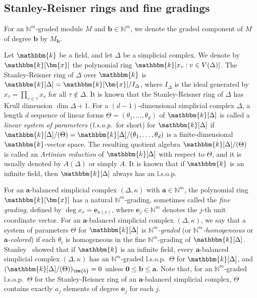 \subsection{Stanley-Reisner rings and fine gradings}
For an $\mathbb{N}^m$-graded module $M$ and $\bm{b} \in \mathbb{N}^m$, we denote the graded component of $M$ of degree $\bm{b}$ by $M_{\bm{b}}$.

Let $\mathbbm{k}$ be a field, and let $\Delta$ be a simplicial complex. We denote by $\mathbbm{k}[\bm{x}]$ the polynomial ring $\mathbbm{k}[x_v : v \in V(\Delta)]$.
The Stanley-Reisner ring of $\Delta$ over $\mathbbm{k}$ is $\mathbbm{k}[\Delta]=\mathbbm{k}[\bm{x}]/I_\Delta$, where $I_\Delta$ is the ideal generated by $x_\tau=\prod_{v \in \tau} x_v$ for all $\tau \not\in \Delta$.
It is known that the Stanley-Reisner ring of $\Delta$ has Krull dimension $\dim \Delta+1$.
For a $(d-1)$-dimensional simplicial complex $\Delta$, a length $d$ sequence of linear forms $\Theta=(\theta_1,\ldots,\theta_d)$ of $\mathbbm{k}[\Delta]$ is called a \emph{linear system of parameters} (\emph{l.s.o.p.}~for short) for $\mathbbm{k}[\Delta]$ if $\mathbbm{k}[\Delta]/(\Theta)=\mathbbm{k}[\Delta]/(\theta_1,\ldots,\theta_d)$ is a finite-dimensional $\mathbbm{k}$-vector space.
The resulting quotient algebra $\mathbbm{k}[\Delta]/(\Theta)$ is called an \emph{Artinian reduction} of $\mathbbm{k}[\Delta]$ with respect to $\Theta$, and it is usually denoted by $A(\Delta)$ or simply $A$.
It is known that if $\mathbbm{k}$ is an infinite field, then $\mathbbm{k}[\Delta]$ always has an l.s.o.p.

For an $\bm{a}$-balanced simplicial complex $(\Delta,\kappa)$ with $\bm{a} \in \mathbb{N}^m$, the polynomial ring $\mathbbm{k}[\bm{x}]$ has a natural $\mathbb{N}^m$-grading, sometimes called the \emph{fine grading}, defined by $\deg x_v = \bm{e}_{\kappa(v)}$, where $\bm{e}_j \in \mathbb{N}^m$ denotes the $j$-th unit coordinate vector.
For an $\bm{a}$-balanced simplicial complex $(\Delta,\kappa)$, we say that a system of parameters $\Theta$ for $\mathbbm{k}[\Delta]$ is \emph{$\mathbb{N}^m$-graded} (or \emph{$\mathbb{N}^m$-homogeneous} or \emph{$\bm{a}$-colored}) if each $\theta_i$ is homogeneous in the fine $\mathbb{N}^m$-grading of $\mathbbm{k}[\Delta]$.
Stanley~\cite[Theorem 4.1]{Sta79} showed that if $\mathbbm{k}$ is an infinite field, every $\bm{a}$-balanced simplicial complex $(\Delta,\kappa)$ has an $\mathbb{N}^m$-graded l.s.o.p.~$\Theta$ for $\mathbbm{k}[\Delta]$, and $(\mathbbm{k}[\Delta]/(\Theta))_{\bm{b}}=0$ unless $\bm{0} \leq \bm{b} \leq \bm{a}$.
Note that, for an $\mathbb{N}^m$-graded l.s.o.p.~$\Theta$ for the Stanley-Reisner ring of an $\bm{a}$-balanced simplicial complex, $\Theta$ contains exactly $a_j$ elements of degree $\bm{e}_j$ for each $j$.

